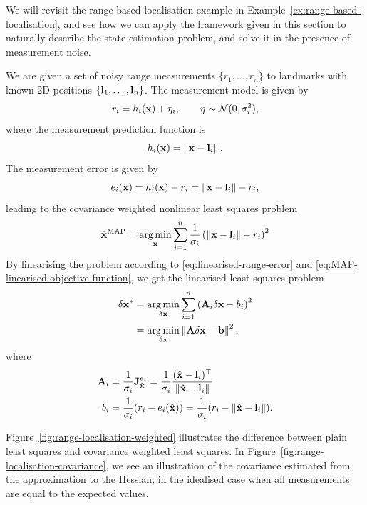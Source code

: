 \begin{example}[frametitle=Range-based localisation with measurement noise] \label{ex:range-based-localisation-noise}
We will revisit the range-based localisation example in Example~\ref{ex:range-based-localisation}, and see how we can apply the framework given in this section to naturally describe the state estimation problem, and solve it in the presence of measurement noise.

We are given a set of noisy range measurements $\{r_1, \ldots, r_n\}$ to landmarks with known 2D positions $\{{\boldsymbol{\mathbf{l}}}_1, \ldots, {\boldsymbol{\mathbf{l}}}_n\}$.
The measurement model is given by
\begin{equation}
  r_i = h_i({\boldsymbol{\mathbf{x}}}) + \eta_i, \qquad \eta \sim \mathcal{N}(0, \sigma^2_i),
\end{equation}
where the measurement prediction function is
\begin{equation}
  h_i({\boldsymbol{\mathbf{x}}}) = \left\lVert{\boldsymbol{\mathbf{x}}} - {\boldsymbol{\mathbf{l}}}_i\right\rVert.
\end{equation}
The measurement error is given by
\begin{equation}
  e_i({\boldsymbol{\mathbf{x}}}) = h_i({\boldsymbol{\mathbf{x}}}) - r_i = \left\lVert{\boldsymbol{\mathbf{x}}} - {\boldsymbol{\mathbf{l}}}_i\right\rVert - r_i,
\end{equation}
leading to the covariance weighted nonlinear least squares problem
\begin{equation} \label{eq:range-MAP-weighted}
  \hat{{\boldsymbol{\mathbf{x}}}}^{\text{MAP}} = \operatorname*{arg\,min}_{\boldsymbol{\mathbf{x}}} \sum^n_{i=1} \frac{1}{\sigma_i} \left( \left\lVert{\boldsymbol{\mathbf{x}}} - {\boldsymbol{\mathbf{l}}}_i\right\rVert - r_i \right)^2
\end{equation}
By linearising the problem according to \eqref{eq:linearised-range-error} and \eqref{eq:MAP-linearised-objective-function}, we get the linearised least squares problem
\begin{align} \label{eq:range-MAP-linearised-problem}
  \delta{\boldsymbol{\mathbf{x}}}^\ast &= \operatorname*{arg\,min}_{\delta{\boldsymbol{\mathbf{x}}}} \sum^n_{i=1} \left( {\boldsymbol{\mathbf{A}}}_i \delta{\boldsymbol{\mathbf{x}}} - b_i \right)^2\\
  &= \operatorname*{arg\,min}_{\delta{\boldsymbol{\mathbf{x}}}} \left\lVert{\boldsymbol{\mathbf{A}}} \delta{\boldsymbol{\mathbf{x}}} - {\boldsymbol{\mathbf{b}}}\right\rVert^2,
\end{align}
where
\begin{align}
  {\boldsymbol{\mathbf{A}}}_i &= \frac{1}{\sigma_i}{{\boldsymbol{\mathbf{J}}}^{e_i}_{\hat{{\boldsymbol{\mathbf{x}}}}}} = \frac{1}{\sigma_i}\frac{(\hat{{\boldsymbol{\mathbf{x}}}} - {\boldsymbol{\mathbf{l}}}_i)^{\top}}{\left\lVert\hat{{\boldsymbol{\mathbf{x}}}} - {\boldsymbol{\mathbf{l}}}_i\right\rVert}\\
  b_i &= \frac{1}{\sigma_i}(r_i - e_i(\hat{{\boldsymbol{\mathbf{x}}}})) = \frac{1}{\sigma_i}(r_i - \left\lVert\hat{{\boldsymbol{\mathbf{x}}}} - {\boldsymbol{\mathbf{l}}}_i\right\rVert).
\end{align}

Figure~\ref{fig:range-localisation-weighted} illustrates the difference between plain least squares and covariance weighted least squares.
In Figure~\ref{fig:range-localisation-covariance}, we see an illustration of the covariance estimated from the approximation to the Hessian, in the idealised case when all measurements are equal to the expected values.
 

\end{example}
